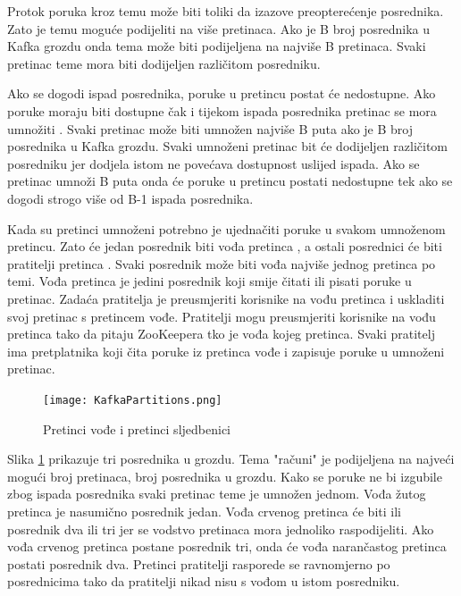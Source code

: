 \documentclass[utf8, diplomski, lmodern, numeric]{fer}
\begin{document}
Protok poruka kroz temu može biti toliki da izazove preopterećenje posrednika. Zato je temu moguće podijeliti na više pretinaca. Ako je B broj posrednika u Kafka grozdu onda tema može biti podijeljena na najviše B pretinaca. Svaki pretinac teme mora biti dodijeljen različitom posredniku.

Ako se dogodi ispad posrednika, poruke u pretincu postat će nedostupne. Ako poruke moraju biti dostupne čak i tijekom ispada posrednika pretinac se mora umnožiti . Svaki pretinac može biti umnožen najviše B puta ako je B broj posrednika u Kafka grozdu. Svaki umnoženi pretinac  bit će dodijeljen različitom posredniku jer dodjela istom ne povećava dostupnost uslijed ispada. Ako se pretinac umnoži B puta onda će poruke u pretincu postati nedostupne tek ako se dogodi strogo više od B-1 ispada posrednika.

Kada su pretinci umnoženi potrebno je ujednačiti poruke u svakom umnoženom pretincu. Zato će jedan posrednik biti vođa pretinca , a ostali posrednici će biti pratitelji pretinca . Svaki posrednik može biti vođa najviše jednog pretinca po temi. Vođa pretinca je jedini posrednik koji smije čitati ili pisati poruke u pretinac. Zadaća pratitelja je preusmjeriti korisnike na vođu pretinca i uskladiti svoj pretinac s pretincem vođe. Pratitelji mogu preusmjeriti korisnike na vođu pretinca tako da pitaju ZooKeepera tko je vođa kojeg pretinca. Svaki pratitelj ima pretplatnika koji čita poruke iz pretinca vođe i zapisuje poruke u umnoženi pretinac.

\begin{figure}[H]
    \centering
    \texttt{[image: KafkaPartitions.png]}
    \caption{Pretinci vođe i pretinci sljedbenici}
    \label{fig:kafka-leader-follower}
\end{figure}

Slika \ref{fig:kafka-leader-follower} prikazuje tri posrednika u grozdu. Tema "računi" je podijeljena na najveći mogući broj pretinaca, broj posrednika u grozdu. Kako se poruke ne bi izgubile zbog ispada posrednika svaki pretinac teme je umnožen jednom. Vođa žutog pretinca je nasumično posrednik jedan. Vođa crvenog pretinca će biti ili posrednik dva ili tri jer se vodstvo pretinaca mora jednoliko raspodijeliti. Ako vođa crvenog pretinca postane posrednik tri, onda će vođa narančastog pretinca postati posrednik dva. Pretinci pratitelji rasporede se ravnomjerno po posrednicima tako da pratitelji nikad nisu s vođom u istom posredniku.
\end{document}
